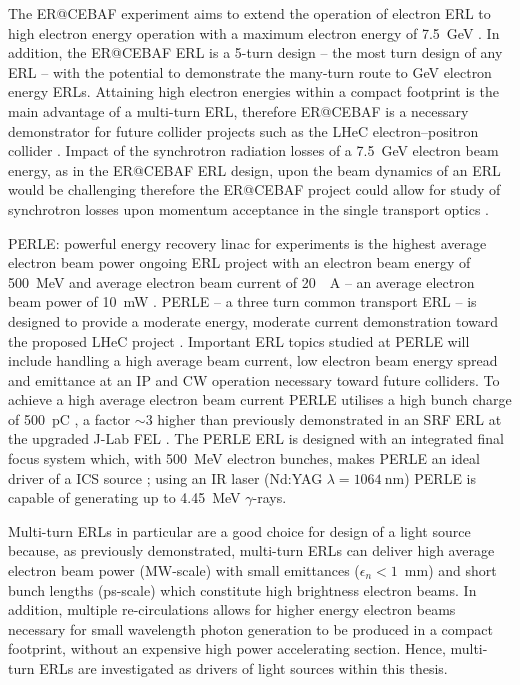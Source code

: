 \documentclass[../main.tex]{subfiles}
\begin{document}
The ER@CEBAF experiment aims to extend the operation of electron ERL to high electron energy operation with a maximum electron energy of 7.5~\si{\giga\electronvolt} \cite{bogacz2016er,meot2016er}. In addition, the ER@CEBAF ERL is a 5-turn design -- the most turn design of any ERL -- with the potential to demonstrate the many-turn route to \si{\giga\electronvolt} electron energy ERLs. Attaining high electron energies within a compact footprint is the main advantage of a multi-turn ERL, therefore ER@CEBAF is a necessary demonstrator for future collider projects such as the LHeC electron--positron collider \cite{valloni2013strawman,bruning2019exploring,holzer2021accelerator}. Impact of the synchrotron radiation losses of a 7.5~\si{\giga\electronvolt} electron beam energy, as in the ER@CEBAF ERL design, upon the beam dynamics of an ERL would be challenging therefore the ER@CEBAF project could allow for study of synchrotron losses upon momentum acceptance in the single transport optics \cite{adolphsen2022european}.  

PERLE: powerful energy recovery linac for experiments is the highest average electron beam power ongoing ERL project with an electron beam energy of 500~\si{\mega\electronvolt} and average electron beam current of 20~\si{\mill\ampere} -- an average electron beam power of 10~\si{\milli\watt} \cite{angal2018perle,bogacz2021perle}. PERLE -- a three turn common transport ERL -- is designed to provide a moderate energy, moderate current demonstration toward the proposed LHeC project \cite{valloni2013strawman,bruning2019exploring,holzer2021accelerator}. Important ERL topics studied at PERLE will include handling a high average beam current, low electron beam energy spread and emittance at an IP and CW operation \cite{adolphsen2022european} necessary toward future colliders. To achieve a high average electron beam current PERLE utilises a high bunch charge of 500~\si{\pico\coulomb} \cite{}, a factor $\sim3$ higher than previously demonstrated in an SRF ERL at the upgraded J-Lab FEL \cite{neil2006jlab}. The PERLE ERL is designed with an integrated final focus system which, with 500~\si{\mega\electronvolt} electron bunches, makes PERLE an ideal driver of a ICS source \cite{adolphsen2022european}; using an IR laser (Nd:YAG $\lambda=1064~\si{\nano\meter}$) PERLE is capable of generating up to 4.45~\si{\mega\electronvolt} $\gamma$-rays.      

Multi-turn ERLs in particular are a good choice for design of a light source because, as previously demonstrated, multi-turn ERLs can deliver high average electron beam power (\si{\mega\watt}-scale) with small emittances ($\epsilon_{n} < 1$~\si{\milli\meter}) and short bunch lengths (\si{\pico\second}-scale) which constitute high brightness electron beams. In addition, multiple re-circulations allows for higher energy electron beams necessary for small wavelength photon generation to be produced in a compact footprint, without an expensive high power accelerating section. Hence, multi-turn ERLs are investigated as drivers of light sources within this thesis.    
\end{document}

